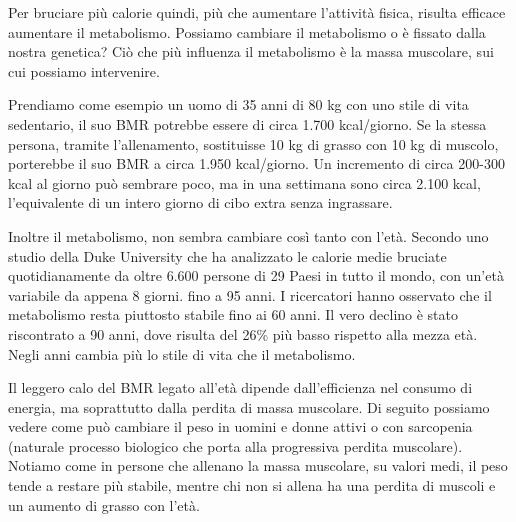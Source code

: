 \documentclass[12pt]{book} %
\begin{document}
Per bruciare più calorie quindi, più che aumentare l'attività fisica, risulta efficace aumentare il metabolismo.
Possiamo cambiare il metabolismo o è fissato dalla nostra genetica? Ciò che più influenza il metabolismo è la massa muscolare, sui cui possiamo intervenire.

Prendiamo come esempio un uomo di 35 anni di 80 kg con uno stile di vita sedentario, il suo BMR potrebbe essere di circa 1.700 kcal/giorno.
Se la stessa persona, tramite l'allenamento, sostituisse 10 kg di grasso con 10 kg di muscolo, porterebbe il suo BMR a circa 1.950 kcal/giorno.
Un incremento di circa 200-300 kcal al giorno può sembrare poco, ma in una settimana sono circa 2.100 kcal, l'equivalente di un intero giorno di cibo extra senza ingrassare.

Inoltre il metabolismo, non sembra cambiare così tanto con l'età. Secondo uno studio della Duke University che ha analizzato le calorie medie bruciate quotidianamente da oltre 6.600 persone di 29 Paesi in tutto il mondo, con un'età variabile da appena 8 giorni. fino a 95 anni. I ricercatori hanno osservato che il metabolismo resta piuttosto stabile fino ai 60 anni. 
Il vero declino è stato riscontrato a 90 anni, dove risulta del 26\% più basso rispetto alla mezza età. Negli anni cambia più lo stile di vita che il metabolismo.

Il leggero calo del BMR legato all'età dipende dall'efficienza nel consumo di energia, ma soprattutto dalla perdita di massa muscolare. Di seguito possiamo vedere come può cambiare il peso in uomini e donne attivi o con sarcopenia (naturale processo biologico che porta alla progressiva perdita muscolare). Notiamo come in persone che allenano la massa muscolare, su valori medi, il peso tende a restare più stabile, mentre chi non si allena ha una perdita di muscoli e un aumento di grasso con l'età.
\end{document}
